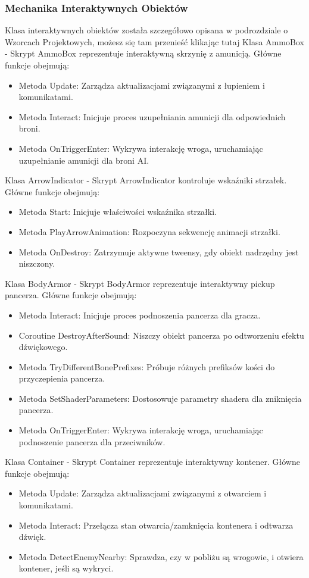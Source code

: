 \subsubsection{Mechanika Interaktywnych Obiektów}

Klasa interaktywnych obiektów została szczegółowo opisana w podrozdziale o Wzorcach Projektowych, możesz się tam przenieść klikając tutaj 
Klasa AmmoBox -
Skrypt AmmoBox reprezentuje interaktywną skrzynię z amunicją. Główne funkcje obejmują:
\begin{itemize}
  \item Metoda Update: Zarządza aktualizacjami związanymi z łupieniem i komunikatami.
  \item Metoda Interact: Inicjuje proces uzupełniania amunicji dla odpowiednich broni.
  \item Metoda OnTriggerEnter: Wykrywa interakcję wroga, uruchamiając uzupełnianie amunicji dla broni AI.
\end{itemize}

Klasa ArrowIndicator -
Skrypt ArrowIndicator kontroluje wskaźniki strzałek. Główne funkcje obejmują:
\begin{itemize}
  \item Metoda Start: Inicjuje właściwości wskaźnika strzałki.
  \item Metoda PlayArrowAnimation: Rozpoczyna sekwencję animacji strzałki.
  \item Metoda OnDestroy: Zatrzymuje aktywne tweensy, gdy obiekt nadrzędny jest niszczony.
\end{itemize}

Klasa BodyArmor -
Skrypt BodyArmor reprezentuje interaktywny pickup pancerza. Główne funkcje obejmują:
\begin{itemize}
  \item Metoda Interact: Inicjuje proces podnoszenia pancerza dla gracza.
  \item Coroutine DestroyAfterSound: Niszczy obiekt pancerza po odtworzeniu efektu dźwiękowego.
  \item Metoda TryDifferentBonePrefixes: Próbuje różnych prefiksów kości do przyczepienia pancerza.
  \item Metoda SetShaderParameters: Dostosowuje parametry shadera dla zniknięcia pancerza.
  \item Metoda OnTriggerEnter: Wykrywa interakcję wroga, uruchamiając podnoszenie pancerza dla przeciwników.
\end{itemize}

Klasa Container -
Skrypt Container reprezentuje interaktywny kontener. Główne funkcje obejmują:
\begin{itemize}
  \item Metoda Update: Zarządza aktualizacjami związanymi z otwarciem i komunikatami.
  \item Metoda Interact: Przełącza stan otwarcia/zamknięcia kontenera i odtwarza dźwięk.
  \item Metoda DetectEnemyNearby: Sprawdza, czy w pobliżu są wrogowie, i otwiera kontener, jeśli są wykryci.
\end{itemize}

